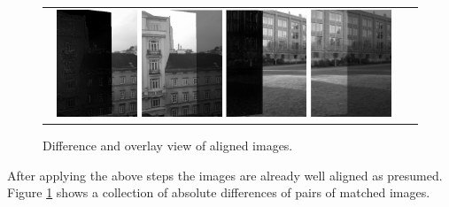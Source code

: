 \begin{figure}[h]
	\centering
	\begin{tabular}{cc}
	\includegraphics[width=0.23\textwidth]{figures/diff1.png} 
	\includegraphics[width=0.23\textwidth]{figures/overlay1.png} 
	\includegraphics[width=0.23\textwidth]{figures/diff2.png} 
	\includegraphics[width=0.23\textwidth]{figures/overlay2.png} 

	\end{tabular}
	\caption{Difference and overlay view of aligned images.}
	\label{fig:a4:diffs}
\end{figure}


After applying the above steps the images are already well aligned as presumed. Figure \ref{fig:a4:diffs} shows a collection of absolute differences of pairs of matched images. 



